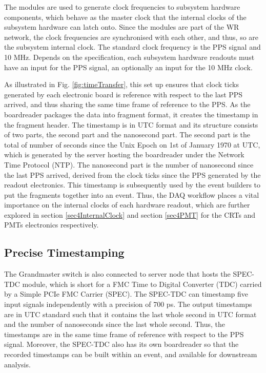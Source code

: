 The modules are used to generate clock frequencies to subsystem hardware components, which behave as the master clock that the internal clocks of the subsystem hardware can latch onto.
Since the modules are part of the WR network, the clock frequencies are synchronised with each other, and thus, so are the subsystem internal clock.
The standard clock frequency is the PPS signal and 10 MHz. 
Depends on the specification, each subsystem hardware readouts must have an input for the PPS signal, an optionally an input for the 10 MHz clock.

As illustrated in Fig. \ref{fig:timeTransfer}, this set up ensures that clock ticks generated by each electronic board is reference with respect to the last PPS arrived, and thus sharing the same time frame of reference to the PPS.
As the boardreader packages the data into fragment format, it creates the timestamp in the fragment header.
The timestamp is in UTC format and its structure consists of two parts, the second part and the nanosecond part.
The second part is the total of number of seconds since the Unix Epoch on 1st of January 1970 at UTC, which is generated by the server hosting the boardreader under the Network Time Protocol (NTP).
The nanosecond part is the number of nanosecond since the last PPS arrived, derived from the clock ticks since the PPS generated by the readout electronics.
This timestamp is subsequently used by the event builders to put the fragments together into an event.
Thus, the DAQ workflow places a vital importance on the internal clocks of each hardware readout, which are further explored in section \ref{sec4InternalClock} and section \ref{sec4PMT} for the CRTs and PMTs electronics respectively.

\subsection{Precise Timestamping}
\label{subsec42TimeRef}

The Grandmaster switch is also connected to server node that hosts the SPEC-TDC module, which is short for a FMC Time to Digital Converter (TDC) carried by a Simple PCIe FMC Carrier (SPEC).
The SPEC-TDC can timestamp five input signals independently with a precision of 700 ps.
The output timestamps are in UTC standard such that it contains the last whole second in UTC format and the number of nanoseconds since the last whole second.
Thus, the timestamps are in the same time frame of reference with respect to the PPS signal.
Moreover, the SPEC-TDC also has its own boardreader so that the recorded timestamps can be built within an event, and available for downstream analysis.

